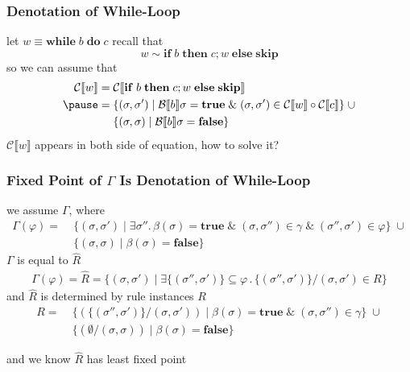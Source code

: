 \documentclass[12pt,aspectratio=169]{beamer}
\newcommand{\denoB}[1]{\mathcal{B} \llbracket #1 \rrbracket}
\newcommand{\denoC}[1]{\mathcal{C} \llbracket #1 \rrbracket}
\newcommand{\true}{\mathbf{true}}
\newcommand{\false}{\mathbf{false}}
\newcommand{\Skip}{\mathbf{skip}}
\newcommand{\ITE}[3]{\mathbf{if}\; #1 \; \mathbf{then} \; #2 \; \mathbf{else} \; #3}
\newcommand{\While}[2]{\mathbf{while}\; #1 \; \mathbf{do} \; #2}
\begin{document}
\begin{frame}
    \frametitle{Denotation of While-Loop}
    let $w \equiv \While{b}{c}$
    \pause
    recall that
    \[
        w \sim \ITE{b}{c;w}{\Skip}
    \]
    \pause
    so we can assume that
    \begin{align*}
        \denoC{w} = & \; \denoC{\ITE{b}{c;w}{\Skip}}\\ \pause
            = & \; \{(\sigma, \sigma') \mid \denoB{b}\sigma = \true \; \& \; (\sigma, \sigma') \in \denoC{w} \circ \denoC{c}\} \; \cup \\
            & \; \{ (\sigma,\sigma) \mid \denoB{b}\sigma = \false \}
    \end{align*}
    \pause
    $\denoC{w}$ appears in both side of equation, how to solve it?
    
\end{frame}

\begin{frame}
    \frametitle{Fixed Point of $\Gamma$ Is Denotation of While-Loop}
    we assume $\Gamma$, where
        \begin{align*}
            \Gamma(\varphi) %
                            = & \; \{(\sigma, \sigma') \mid \exists \sigma'' .\, \beta(\sigma) = \true \; \& \; (\sigma, \sigma'') \in \gamma \; \& \; (\sigma'', \sigma') \in \varphi\} \; \cup \\
                            & \; \{(\sigma,\sigma) \mid \beta(\sigma) = \false \}
        \end{align*}
    $\Gamma$ is equal to $\widehat{R}$
    \begin{align*}
        \Gamma(\varphi) = \widehat{R} = \{(\sigma,\sigma') \mid \exists \{(\sigma'',\sigma')\} \subseteq \varphi \, . \, \{(\sigma'',\sigma')\} / (\sigma, \sigma') \in R \}
    \end{align*}
    and $\widehat{R}$ is determined by rule instances $R$
    \begin{align*}
        R = & \; \{ (\{(\sigma'', \sigma')\} / (\sigma, \sigma')) \mid \beta(\sigma) = \true \; \& \; (\sigma, \sigma'') \in \gamma\}\; \cup \\
        & \; \{(\emptyset / (\sigma,\sigma)) \mid \beta(\sigma) = \false \}
    \end{align*}

    and we know $\widehat{R}$ has least fixed point
\end{frame}
\end{document}
